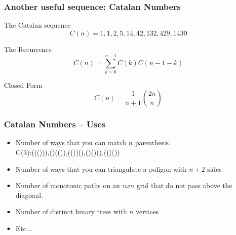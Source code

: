 \documentclass{beamer}
\begin{document}
\begin{frame}
  \frametitle{Another useful sequence: Catalan Numbers}
  {\smaller
  \begin{block}{The Catalan sequence}
    \begin{equation*}
      C(n) = 1, 1, 2, 5, 14, 42, 132, 429, 1430
    \end{equation*}
  \end{block}

  \begin{exampleblock}{The Recurrence}
    \begin{equation*}
    C(n) = \sum^{n-1}_{k=0}C(k)C(n-1-k)
    \end{equation*}
  \end{exampleblock}

  \begin{exampleblock}{Closed Form}
    \begin{equation*}
      C(n) = \frac{1}{n+1}\binom{2n}{n}
    \end{equation*}
  \end{exampleblock}
  }
\end{frame}

\begin{frame}
  \frametitle{Catalan Numbers -- Uses}
  \begin{itemize}
    \item Number of ways that you can match $n$ parenthesis.\\
      C(3):((())),()(()),(())(),()()(),(()())

      \medskip
      
    \item Number of ways that you can triangulate a poligon with $n+2$ sides
    \item Number of monotonic paths on an $nxn$ grid that do not pass above
      the diagonal.
    \item Number of distinct binary trees with $n$ vertices
    \item Etc...
  \end{itemize}
\end{frame}
\end{document}
